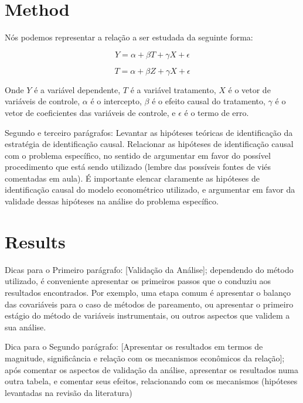 \documentclass[a4paper]{article}
\begin{document}
\section{Method}

Nós podemos representar a relação a ser estudada da seguinte forma:

\begin{equation}
Y = \alpha + \beta T + \gamma X + \epsilon
\end{equation}

\begin{equation}
T = \alpha + \beta Z + \gamma X + \epsilon
\end{equation}

Onde $Y$ é a variável dependente, $T$ é a variável tratamento, $X$ é o vetor de variáveis de controle, $\alpha$ é o intercepto, $\beta$ é o efeito causal do tratamento, $\gamma$ é o vetor de coeficientes das variáveis de controle, e $\epsilon$ é o termo de erro.

Segundo e terceiro parágrafos: Levantar as hipóteses teóricas de identificação da estratégia de identificação causal. Relacionar as hipóteses de identificação causal com o problema específico, no sentido de argumentar em favor do possível procedimento que está sendo utilizado (lembre das possíveis fontes de viés comentadas em aula). É importante elencar claramente as hipóteses de identificação causal do modelo econométrico utilizado, e argumentar em favor da validade dessas hipóteses na análise do problema específico.


\section{Results}

Dicas para o Primeiro parágrafo: [Validação da Análise]; dependendo do método utilizado, é conveniente apresentar os primeiros passos que o conduziu aos resultados encontrados. Por exemplo, uma etapa comum é apresentar o balanço das covariáveis para o caso de métodos de pareamento, ou apresentar o primeiro estágio do método de variáveis instrumentais, ou outros aspectos que validem a sua análise.

Dica para o Segundo parágrafo: [Apresentar os resultados em termos de magnitude, significância e relação com os mecanismos econômicos da relação]; após comentar os aspectos de validação da análise, apresentar os resultados numa outra tabela, e comentar seus efeitos, relacionando com os mecanismos (hipóteses levantadas na revisão da literatura)
\end{document}
